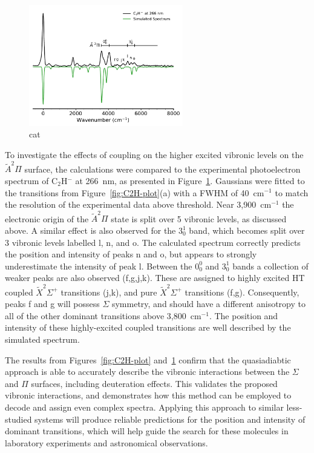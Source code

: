 \documentclass[journal=jpcafh,manuscript=article,layout=onecolumn, 12pt]{achemso}
\begin{document}
\begin{figure}[th!]
	\includegraphics[width=0.6\textwidth]{figures/266-plot.pdf}
	\caption{cat}
	\label{fig:266-plot}
\end{figure}
To investigate the effects of coupling on the higher excited vibronic levels on the$\tilde{A} ^2\Pi$ surface, the calculations were compared to the experimental photoelectron spectrum of C$_2$H$^-$ at 266~nm, as presented in Figure~\ref{fig:266-plot}. Gaussians were fitted to the transitions from Figure~\ref{fig:C2H-plot}(a) with a FWHM of 40~cm$^{-1}$ to match the resolution of the experimental data above threshold. Near 3,900~cm$^{-1}$ the electronic origin of the $\tilde{A} ^2\Pi$ state is split over 5 vibronic levels, as discussed above. A similar effect is also observed for the $3^1_0$ band, which becomes split over 3 vibronic levels labelled l, n, and o. The calculated spectrum correctly predicts the position and intensity of peaks n and o, but appears to strongly underestimate the intensity of peak l. Between the $0^0_0$ and $3^1_0$ bands a collection of weaker peaks are also observed (f,g,j,k). These are assigned to highly excited HT coupled $\tilde{X} ^2\Sigma^+$ transitions (j,k), and pure $\tilde{X} ^2\Sigma^+$ transitions (f,g). Consequently, peaks f and g will possess $\Sigma$ symmetry, and should have a different anisotropy to all of the other dominant transitions above 3,800~cm$^{-1}$. The position and intensity of these highly-excited coupled transitions are well described by the simulated spectrum. 

The results from Figures~\ref{fig:C2H-plot} and~\ref{fig:266-plot} confirm that the quasiadiabtic approach is able to accurately describe the vibronic interactions between the $\Sigma$ and $\Pi$ surfaces, including deuteration effects. This validates the proposed vibronic interactions, and demonstrates how this method can be employed to decode and assign even complex spectra. Applying this approach to similar less-studied systems will produce reliable predictions for the position and intensity of dominant transitions, which will help guide the search for these molecules in laboratory experiments and astronomical observations. 
\end{document}
